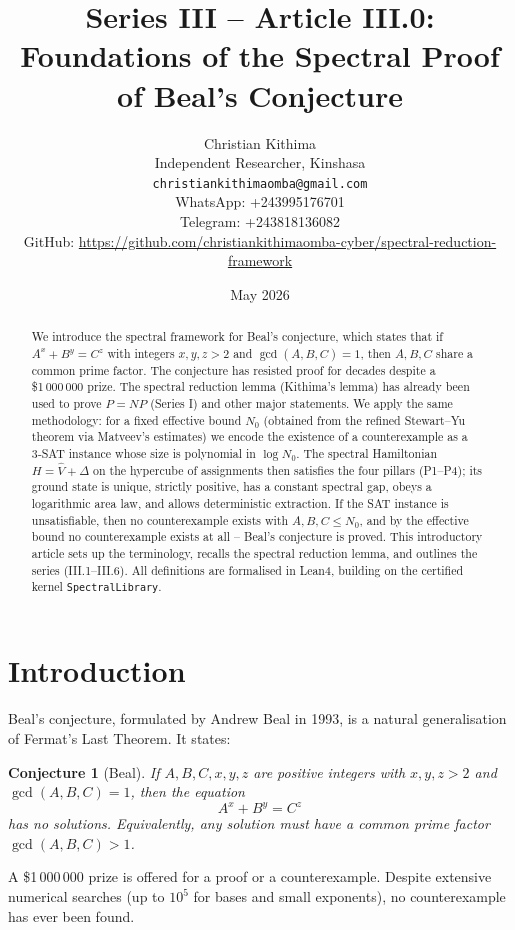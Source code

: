 \documentclass[11pt,a4paper]{article}
\title{Series III – Article III.0: Foundations of the Spectral Proof of Beal's Conjecture}
\author{Christian Kithima \\
Independent Researcher, Kinshasa \\
\texttt{christiankithimaomba@gmail.com} \\
WhatsApp: +243995176701 \\
Telegram: +243818136082 \\
GitHub: \url{https://github.com/christiankithimaomba-cyber/spectral-reduction-framework}}
\date{May 2026}
\newtheorem{conjecture}[theorem]{Conjecture}
\begin{document}
\maketitle

\begin{abstract}
We introduce the spectral framework for Beal's conjecture, which states that if \(A^x + B^y = C^z\) with integers \(x,y,z > 2\) and \(\gcd(A,B,C)=1\), then \(A,B,C\) share a common prime factor. The conjecture has resisted proof for decades despite a \$1 000 000 prize. The spectral reduction lemma (Kithima's lemma) has already been used to prove \(P = NP\) (Series I) and other major statements. We apply the same methodology: for a fixed effective bound \(N_0\) (obtained from the refined Stewart–Yu theorem via Matveev's estimates) we encode the existence of a counterexample as a 3‑SAT instance whose size is polynomial in \(\log N_0\). The spectral Hamiltonian \(H = \hat{V} + \Delta\) on the hypercube of assignments then satisfies the four pillars (P1–P4); its ground state is unique, strictly positive, has a constant spectral gap, obeys a logarithmic area law, and allows deterministic extraction. If the SAT instance is unsatisfiable, then no counterexample exists with \(A,B,C \le N_0\), and by the effective bound no counterexample exists at all – Beal's conjecture is proved. This introductory article sets up the terminology, recalls the spectral reduction lemma, and outlines the series (III.1–III.6). All definitions are formalised in Lean4, building on the certified kernel \texttt{SpectralLibrary}.
\end{abstract}

\tableofcontents

\section{Introduction}

Beal's conjecture, formulated by Andrew Beal in 1993, is a natural generalisation of Fermat's Last Theorem. It states:

\begin{conjecture}[Beal]
If \(A,B,C,x,y,z\) are positive integers with \(x,y,z > 2\) and \(\gcd(A,B,C)=1\), then the equation
\[
A^x + B^y = C^z
\]
has no solutions. Equivalently, any solution must have a common prime factor \(\gcd(A,B,C) > 1\).
\end{conjecture}

A \$1 000 000 prize is offered for a proof or a counterexample. Despite extensive numerical searches (up to \(10^5\) for bases and small exponents), no counterexample has ever been found.
\end{document}
